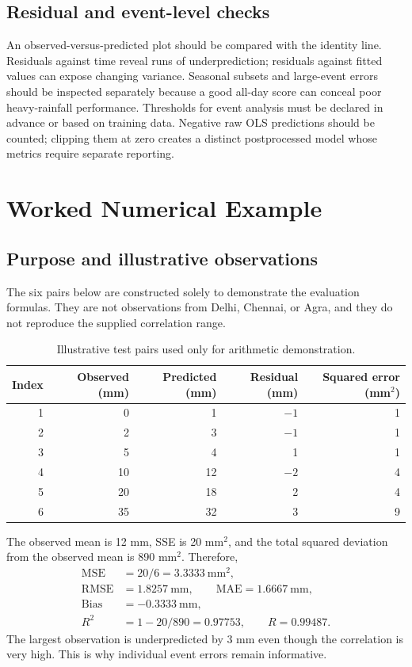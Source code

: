 \documentclass[11pt,a4paper]{article}
\newcommand{\sectionpage}[1]{\clearpage\section{#1}}
\begin{document}
\subsection{Residual and event-level checks}
An observed-versus-predicted plot should be compared with the identity line. Residuals against time reveal runs of underprediction; residuals against fitted values can expose changing variance. Seasonal subsets and large-event errors should be inspected separately because a good all-day score can conceal poor heavy-rainfall performance. Thresholds for event analysis must be declared in advance or based on training data. Negative raw OLS predictions should be counted; clipping them at zero creates a distinct postprocessed model whose metrics require separate reporting.

\sectionpage{Worked Numerical Example}
\subsection{Purpose and illustrative observations}
The six pairs below are constructed solely to demonstrate the evaluation formulas. They are not observations from Delhi, Chennai, or Agra, and they do not reproduce the supplied correlation range.

\begin{table}[h!]\centering
\begin{tabular}{@{}rrrrr@{}}\toprule
Index & Observed (mm) & Predicted (mm) & Residual (mm) & Squared error (mm$^2$)\\\midrule
1&0&1&$-1$&1\\2&2&3&$-1$&1\\3&5&4&1&1\\4&10&12&$-2$&4\\5&20&18&2&4\\6&35&32&3&9\\\bottomrule
\end{tabular}
\caption{Illustrative test pairs used only for arithmetic demonstration.}
\end{table}
The observed mean is 12 mm, SSE is 20 mm$^2$, and the total squared deviation from the observed mean is 890 mm$^2$. Therefore,
\begin{align*}
\mathrm{MSE}&=20/6=3.3333\ \mathrm{mm}^2,\\
\mathrm{RMSE}&=1.8257\ \mathrm{mm},\qquad \mathrm{MAE}=1.6667\ \mathrm{mm},\\
\mathrm{Bias}&=-0.3333\ \mathrm{mm},\\
R^2&=1-20/890=0.97753,\qquad R=0.99487.
\end{align*}
The largest observation is underpredicted by 3 mm even though the correlation is very high. This is why individual event errors remain informative.
\end{document}
